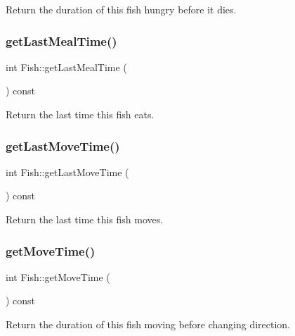Return the duration of this fish hungry before it dies. 

\mbox{\label{class_fish_a078c712871cc4e9f7d3ed98a6c95f12e}} 
\subsubsection{\texorpdfstring{get\+Last\+Meal\+Time()}{getLastMealTime()}}
{\footnotesize\ttfamily int Fish\+::get\+Last\+Meal\+Time (\begin{DoxyParamCaption}{ }\end{DoxyParamCaption}) const}



Return the last time this fish eats. 

\mbox{\label{class_fish_a4ddf35ce18487be8976ba505e50693b2}} 
\subsubsection{\texorpdfstring{get\+Last\+Move\+Time()}{getLastMoveTime()}}
{\footnotesize\ttfamily int Fish\+::get\+Last\+Move\+Time (\begin{DoxyParamCaption}{ }\end{DoxyParamCaption}) const}



Return the last time this fish moves. 

\mbox{\label{class_fish_a3a337242dce822aeb5a0e063d7b99e39}} 
\subsubsection{\texorpdfstring{get\+Move\+Time()}{getMoveTime()}}
{\footnotesize\ttfamily int Fish\+::get\+Move\+Time (\begin{DoxyParamCaption}{ }\end{DoxyParamCaption}) const}



Return the duration of this fish moving before changing direction. 

